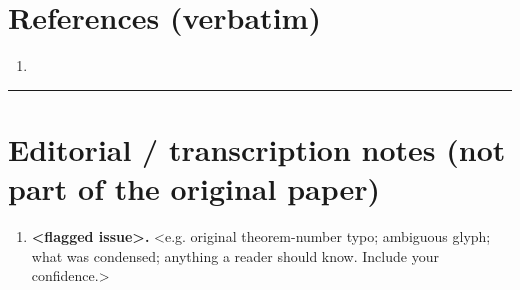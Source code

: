 \documentclass[11pt]{article}
\begin{document}
\section*{References (verbatim)}
\begin{enumerate}
\item[{[1]}] <reference, verbatim>
\end{enumerate}

\bigskip\hrule\bigskip

\section*{Editorial / transcription notes (not part of the original paper)}
\begin{enumerate}
\item \textbf{<flagged issue>.} <e.g. original theorem-number typo; ambiguous glyph;
what was condensed; anything a reader should know. Include your confidence.>
\end{enumerate}
\end{document}
